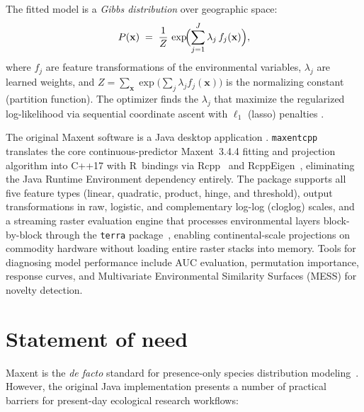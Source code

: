 \documentclass[10pt,letterpaper]{article}
\begin{document}
The fitted model is a \emph{Gibbs distribution} over geographic space:
\begin{equation}\label{eq:gibbs}
  P(\mathbf{x}) \;=\;
    \frac{1}{Z}\,
    \exp\!\Bigl(\sum_{j=1}^{J} \lambda_j\, f_j(\mathbf{x})\Bigr),
\end{equation}
where $f_j$ are feature transformations of the environmental variables,
$\lambda_j$ are learned weights, and
$Z = \sum_{\mathbf{x}}\exp\!\bigl(\sum_j \lambda_j f_j(\mathbf{x})\bigr)$
is the normalizing constant (partition function).
The optimizer finds the $\lambda_j$ that maximize the regularized
log-likelihood via sequential coordinate ascent with
$\ell_1$ (lasso) penalties \cite{Phillips2006,Elith2011}.

The original Maxent software is a Java desktop application
\cite{Phillips2017}.
\texttt{maxentcpp} translates the core continuous-predictor Maxent~3.4.4
fitting and projection algorithm into C++17 with R~bindings via
Rcpp~\cite{Eddelbuettel2011} and RcppEigen~\cite{Bates2013}, eliminating
the Java Runtime Environment dependency entirely.
The package supports all five feature types (linear, quadratic, product,
hinge, and threshold), output transformations in raw, logistic, and
complementary log-log (cloglog) scales, and a streaming raster
evaluation engine that processes environmental layers block-by-block
through the \texttt{terra} package~\cite{Hijmans2024}, enabling
continental-scale projections on commodity hardware without loading
entire raster stacks into memory.
Tools for diagnosing model performance include AUC evaluation, permutation
importance, response curves, and Multivariate Environmental Similarity
Surfaces (MESS) for novelty detection.

\section*{Statement of need}

Maxent is the \emph{de facto} standard for presence-only species
distribution modeling~\cite{Merow2013}.
However, the original Java implementation presents a number of practical
barriers for present-day ecological research workflows:
\end{document}
